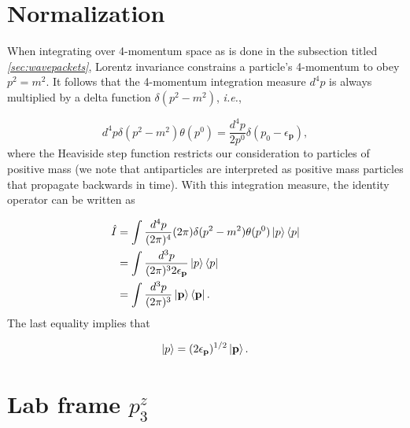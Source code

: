 \documentclass{article}
\begin{document}
\pagebreak
\section{Normalization}
\label{app:normalization}

When integrating over 4-momentum space as is done in the subsection titled
\textit{\ref{sec:wavepackets}}, Lorentz invariance constrains a particle's
4-momentum to obey $p^2 = m^2$.
It follows that the 4-momentum integration measure $d^4p$ is always multiplied
by a delta function $\delta(p^2-m^2)$, \textit{i.e.},

\begin{equation}
    d^4p\delta(p^2 - m^2)\theta(p^0)
    =
    \frac{d^4p}{2p^0}\delta(p_0 - \epsilon_\mathbf{p}),
\end{equation}
%
where the Heaviside step function restricts our consideration to particles of
positive mass (we note that antiparticles are interpreted as positive mass
particles that propagate backwards in time).  With this integration measure,
the identity operator can be written as

\begin{equation}
\label{eq:identity}
\begin{aligned}
    \hat{I}
    &=
    \int \frac{d^4p}{(2\pi)^4}(2\pi)\delta(p^2 - m^2)\theta(p^0)
    \ket{p}\bra{p}
    \\&=
    \int \frac{d^3p}{(2\pi)^3 2\epsilon_\mathbf{p}}
    \ket{p}\bra{p}
    \\&=
    \int \frac{d^3p}{(2\pi)^3}
    \ket{\mathbf{p}}\bra{\mathbf{p}}.
\end{aligned}
\end{equation}
%
The last equality implies that

\begin{equation}
\label{eq:normalization}
    \ket{p} = (2\epsilon_\mathbf{p})^{1/2}\ket{\mathbf{p}}.
\end{equation}


\pagebreak
\section{Lab frame $p^z_3$}
\label{app:p3z}
\end{document}
